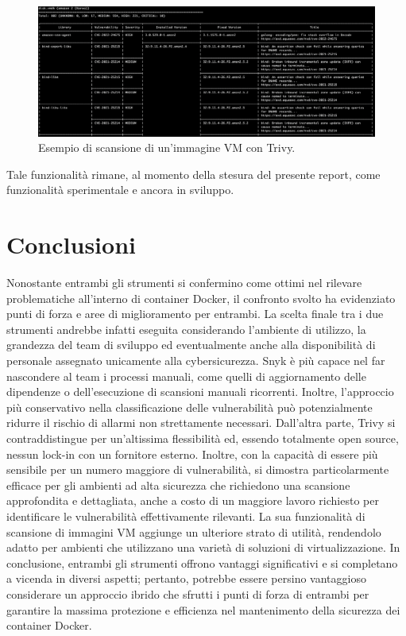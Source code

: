 \begin{figure}[H]
   \centering
   \includegraphics[width=1\textwidth]{immagini/capitolo2/trivy_vm.png}
   \caption{Esempio di scansione di un'immagine VM con Trivy.}
   \label{fig:trivy_vm}
\end{figure}
Tale funzionalità rimane, al momento della stesura del presente report, come funzionalità sperimentale e ancora in sviluppo.

\section{Conclusioni}
Nonostante entrambi gli strumenti si confermino come ottimi nel rilevare problematiche all'interno di container Docker, il confronto svolto ha evidenziato punti di forza e aree di miglioramento per entrambi. La scelta finale tra i due strumenti andrebbe infatti eseguita considerando l'ambiente di utilizzo, la grandezza del team di sviluppo ed eventualmente anche alla disponibilità di personale assegnato unicamente alla cybersicurezza. Snyk è più capace nel far nascondere al team i processi manuali, come quelli di aggiornamento delle dipendenze o dell'esecuzione di scansioni manuali ricorrenti. Inoltre, l'approccio più conservativo nella classificazione delle vulnerabilità può potenzialmente ridurre il rischio di allarmi non strettamente necessari. Dall'altra parte, Trivy si contraddistingue per un'altissima flessibilità ed, essendo totalmente open source, nessun lock-in con un fornitore esterno. Inoltre, con la capacità di essere più sensibile per un numero maggiore di vulnerabilità, si dimostra particolarmente efficace per gli ambienti ad alta sicurezza che richiedono una scansione approfondita e dettagliata, anche a costo di un maggiore lavoro richiesto per identificare le vulnerabilità effettivamente rilevanti. La sua funzionalità di scansione di immagini VM aggiunge un ulteriore strato di utilità, rendendolo adatto per ambienti che utilizzano una varietà di soluzioni di virtualizzazione. In conclusione, entrambi gli strumenti offrono vantaggi significativi e si completano a vicenda in diversi aspetti; pertanto, potrebbe essere persino vantaggioso considerare un approccio ibrido che sfrutti i punti di forza di entrambi per garantire la massima protezione e efficienza nel mantenimento della sicurezza dei container Docker.